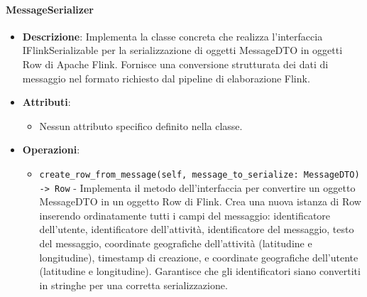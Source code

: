 \documentclass[10pt]{article}
\begin{document}
    \paragraph{MessageSerializer}
    \begin{itemize} 
    \item \textbf{Descrizione}: Implementa la classe concreta che realizza l'interfaccia IFlinkSerializable per la serializzazione di oggetti MessageDTO in oggetti Row di Apache Flink. Fornisce una conversione strutturata dei dati di messaggio nel formato richiesto dal pipeline di elaborazione Flink.
    \item \textbf{Attributi}:
    \begin{itemize}
        \item Nessun attributo specifico definito nella classe.
    \end{itemize}
    
    \item \textbf{Operazioni}:
    \begin{itemize}
        \item \texttt{create\_row\_from\_message(self, message\_to\_serialize: MessageDTO) -> Row} - Implementa il metodo dell'interfaccia per convertire un oggetto MessageDTO in un oggetto Row di Flink. Crea una nuova istanza di Row inserendo ordinatamente tutti i campi del messaggio: identificatore dell'utente, identificatore dell'attività, identificatore del messaggio, testo del messaggio, coordinate geografiche dell'attività (latitudine e longitudine), timestamp di creazione, e coordinate geografiche dell'utente (latitudine e longitudine). Garantisce che gli identificatori siano convertiti in stringhe per una corretta serializzazione.
    \end{itemize}
    \end{itemize}
\end{document}
